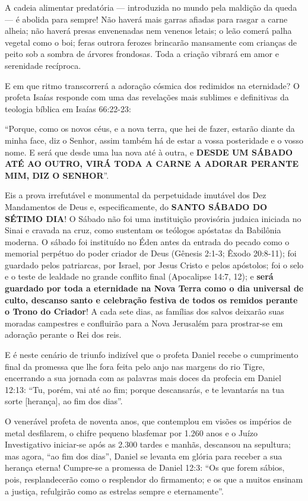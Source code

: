 \documentclass[11pt,a4paper,openany]{book}
\begin{document}
A cadeia alimentar predatória — introduzida no mundo pela maldição da queda — é abolida para sempre! Não haverá mais garras afiadas para rasgar a carne alheia; não haverá presas envenenadas nem venenos letais; o leão comerá palha vegetal como o boi; feras outrora ferozes brincarão mansamente com crianças de peito sob a sombra de árvores frondosas. Toda a criação vibrará em amor e serenidade recíproca.

E em que ritmo transcorrerá a adoração cósmica dos redimidos na eternidade?
O profeta Isaías responde com uma das revelações mais sublimes e definitivas da teologia bíblica em Isaías 66:22-23:

``Porque, como os novos céus, e a nova terra, que hei de fazer, estarão diante da minha face, diz o Senhor, assim também há de estar a vossa posteridade e o vosso nome. E será que desde uma lua nova até à outra, e \textbf{DESDE UM SÁBADO ATÉ AO OUTRO, VIRÁ TODA A CARNE A ADORAR PERANTE MIM, DIZ O SENHOR}''.

Eis a prova irrefutável e monumental da perpetuidade imutável dos Dez Mandamentos de Deus e, especificamente, do \textbf{SANTO SÁBADO DO SÉTIMO DIA}!
O Sábado não foi uma instituição provisória judaica iniciada no Sinai e cravada na cruz, como sustentam os teólogos apóstatas da Babilônia moderna. O sábado foi instituído no Éden antes da entrada do pecado como o memorial perpétuo do poder criador de Deus (Gênesis 2:1-3; Êxodo 20:8-11); foi guardado pelos patriarcas, por Israel, por Jesus Cristo e pelos apóstolos; foi o selo e o teste de lealdade no grande conflito final (Apocalipse 14:7, 12); e \textbf{será guardado por toda a eternidade na Nova Terra como o dia universal de culto, descanso santo e celebração festiva de todos os remidos perante o Trono do Criador}! A cada sete dias, as famílias dos salvos deixarão suas moradas campestres e confluirão para a Nova Jerusalém para prostrar-se em adoração perante o Rei dos reis.

E é neste cenário de triunfo indizível que o profeta Daniel recebe o cumprimento final da promessa que lhe fora feita pelo anjo nas margens do rio Tigre, encerrando a sua jornada com as palavras mais doces da profecia em Daniel 12:13:
``Tu, porém, vai até ao fim; porque descansarás, e te levantarás na tua sorte [herança], ao fim dos dias''.

O venerável profeta de noventa anos, que contemplou em visões os impérios de metal desfilarem, o chifre pequeno blasfemar por 1.260 anos e o Juízo Investigativo iniciar-se após as 2.300 tardes e manhãs, descansou na sepultura; mas agora, ``ao fim dos dias'', Daniel se levanta em glória para receber a sua herança eterna! Cumpre-se a promessa de Daniel 12:3:
``Os que forem sábios, pois, resplandecerão como o resplendor do firmamento; e os que a muitos ensinam a justiça, refulgirão como as estrelas sempre e eternamente''.
\end{document}
